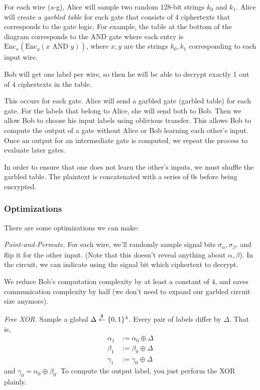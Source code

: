 
For each wire (a-g), Alice will sample two random 128-bit strings $k_0$ and $k_1$. Alice will create a \textit{garbled table} for each gate that consists of 4 ciphertexts that corresponds to the gate logic. For example, the table at the bottom of the diagram corresponds to the AND gate where each entry is $\text{Enc}_x (\text{Enc}_y(x \text{ AND } y))$, where $x,y$ are the strings $k_0, k_1$ corresponding to each input wire.

Bob will get one label per wire, so then he will be able to decrypt exactly 1 out of 4 ciphertexts in the table.

This occurs for each gate. Alice will send a garbled gate (garbled table) for each gate. For the labels that belong to Alice, she will send both to Bob. Then we allow Bob to choose his input labels using oblivious transfer. This allows Bob to compute the output of a gate without Alice or Bob learning each other's input. Once an output for an intermediate gate is computed, we repeat the process to evaluate later gates.


In order to ensure that one does not learn the other's inputs, we must shuffle the garbled table. The plaintext is concatenated with a series of 0s before being encrypted.

\subsubsection{Optimizations}
There are some optimizations we can make:

\emph{Point-and-Permute.} For each wire, we'll randomly sample signal bits $\sigma_\alpha, \sigma_\beta$, and flip it for the other input. (Note that this doesn't reveal anything about $\alpha,\beta$). In the circuit, we can indicate using the signal bit which ciphertext to decrypt.


We reduce Bob's computation complexity by at least a constant of $4$, and saves communication complexity by half (we don't need to expand our garbled circuit size anymore).

\emph{Free \textsf{XOR}.} Sample a global $\Delta\overset{\$}{\leftarrow}\{0,1\}^\lambda$. Every pair of labels differ by $\Delta$. That is,
\begin{align*}
    \alpha_1 & :=\alpha_0\oplus \Delta \\
    \beta_1  & :=\beta_0\oplus \Delta  \\
    \gamma_1 & :=\gamma_0\oplus \Delta
\end{align*}
and $\gamma_0 = \alpha_0\oplus \beta_0$. To compute the output label, you just perform the \textsf{XOR} plainly.

